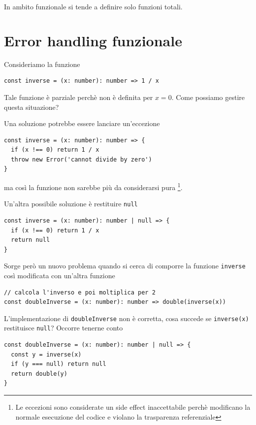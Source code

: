 \documentclass[12pt]{article}
\begin{document}
In ambito funzionale si tende a definire solo funzioni totali.

\newpage

\section{Error handling funzionale}

Consideriamo la funzione

\begin{verbatim}
const inverse = (x: number): number => 1 / x
\end{verbatim}

Tale funzione è parziale perchè non è definita per $x = 0$. Come possiamo gestire questa situazione?

Una soluzione potrebbe essere lanciare un'eccezione

\begin{verbatim}
const inverse = (x: number): number => {
  if (x !== 0) return 1 / x
  throw new Error('cannot divide by zero')
}
\end{verbatim}

ma così la funzione non sarebbe più da considerarsi pura
\footnote{Le eccezioni sono considerate un side effect inaccettabile perchè modificano la normale esecuzione del codice
e violano la trasparenza referenziale}.

Un'altra possibile soluzione è restituire \texttt{null}

\begin{verbatim}
const inverse = (x: number): number | null => {
  if (x !== 0) return 1 / x
  return null
}
\end{verbatim}

Sorge però un nuovo problema quando si cerca di comporre la funzione \texttt{inverse} così modificata con un'altra funzione

\begin{verbatim}
// calcola l'inverso e poi moltiplica per 2
const doubleInverse = (x: number): number => double(inverse(x))
\end{verbatim}

L'implementazione di \texttt{doubleInverse} non è corretta, cosa succede se \texttt{inverse(x)} restituisce \texttt{null}?
Occorre tenerne conto

\begin{verbatim}
const doubleInverse = (x: number): number | null => {
  const y = inverse(x)
  if (y === null) return null
  return double(y)
}
\end{verbatim}
\end{document}
